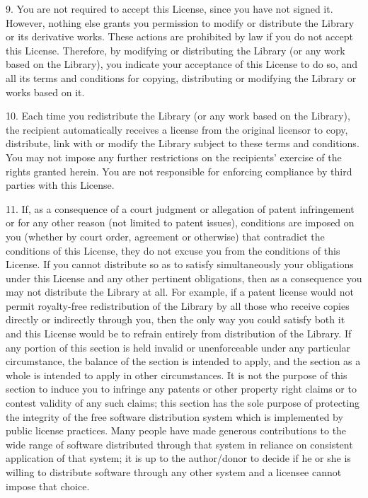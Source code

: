 9. You are not required to accept this License, since you have not signed it. However, nothing else grants you permission to modify or distribute the Library or its derivative works. These actions are prohibited by law if you do not accept this License. Therefore, by modifying or distributing the Library (or any work based on the Library), you indicate your acceptance of this License to do so, and all its terms and conditions for copying, distributing or modifying the Library or works based on it.

10. Each time you redistribute the Library (or any work based on the Library), the recipient automatically receives a license from the original licensor to copy, distribute, link with or modify the Library subject to these terms and conditions. You may not impose any further restrictions on the recipients' exercise of the rights granted herein. You are not responsible for enforcing compliance by third parties with this License.

11. If, as a consequence of a court judgment or allegation of patent infringement or for any other reason (not limited to patent issues), conditions are imposed on you (whether by court order, agreement or otherwise) that contradict the conditions of this License, they do not excuse you from the conditions of this License. If you cannot distribute so as to satisfy simultaneously your obligations under this License and any other pertinent obligations, then as a consequence you may not distribute the Library at all. For example, if a patent license would not permit royalty-free redistribution of the Library by all those who receive copies directly or indirectly through you, then the only way you could satisfy both it and this License would be to refrain entirely from distribution of the Library. If any portion of this section is held invalid or unenforceable under any particular circumstance, the balance of the section is intended to apply, and the section as a whole is intended to apply in other circumstances. It is not the purpose of this section to induce you to infringe any patents or other property right claims or to contest validity of any such claims; this section has the sole purpose of protecting the integrity of the free software distribution system which is implemented by public license practices. Many people have made generous contributions to the wide range of software distributed through that system in reliance on consistent application of that system; it is up to the author/donor to decide if he or she is willing to distribute software through any other system and a licensee cannot impose that choice.

